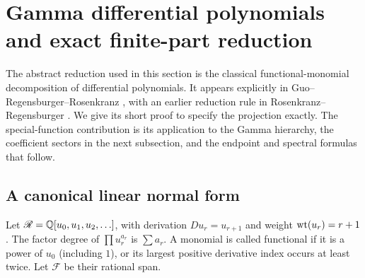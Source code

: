 \section[Gamma differential polynomials and exact finite-part reduction]{Gamma differential polynomials\\and exact finite-part reduction}
\label{gamma:sec}

The abstract reduction used in this section is the classical
functional-monomial decomposition of differential polynomials.
It appears explicitly in Guo--Regensburger--Rosenkranz
\cite[Proposition~4.10]{Guo2014}, with an earlier reduction rule in
Rosenkranz--Regensburger \cite[Lemma~5]{Rosenkranz2008}.
We give its short proof to specify the projection exactly.  The
special-function contribution is its application to the Gamma
hierarchy, the coefficient sectors in the next subsection, and the
endpoint and spectral formulas that follow.

\subsection{A canonical linear normal form}

Let $\mathscr R=\mathbb Q[u_0,u_1,u_2,\ldots]$, with derivation
$D u_r=u_{r+1}$ and weight $\operatorname{wt}(u_r)=r+1$.
The factor degree of $\prod u_r^{a_r}$ is $\sum a_r$.
A monomial is called functional if it is a power of $u_0$ (including
$1$), or its largest positive derivative index occurs at least twice.
Let $\mathscr F$ be their rational span.

